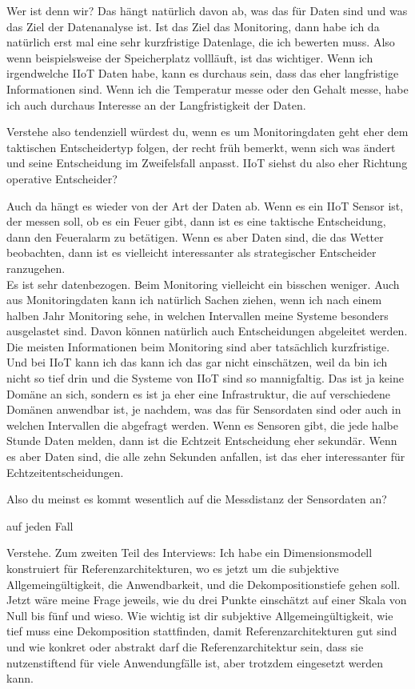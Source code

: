 \PA	 Wer ist denn wir? Das hängt natürlich davon ab, was das für Daten sind und was das Ziel der Datenanalyse ist. Ist das Ziel das Monitoring, dann habe ich da natürlich erst mal eine sehr kurzfristige Datenlage, die ich bewerten muss. Also wenn beispielsweise der Speicherplatz vollläuft, ist das wichtiger. Wenn ich irgendwelche \ac{IIoT} Daten habe, kann es durchaus sein, dass das eher langfristige Informationen sind. Wenn ich die Temperatur messe oder den \coo{} Gehalt messe, habe ich auch durchaus Interesse an der Langfristigkeit der Daten.

\LF	 Verstehe also tendenziell würdest du, wenn es um Monitoringdaten geht eher dem taktischen Entscheidertyp folgen, der recht früh bemerkt, wenn sich was ändert und seine Entscheidung im Zweifelsfall anpasst. \ac{IIoT} siehst du also eher Richtung operative Entscheider?

\PA	Auch da hängt es wieder von der Art der Daten ab. Wenn es ein \ac{IIoT} Sensor ist, der messen soll, ob es ein Feuer gibt, dann ist es eine taktische Entscheidung, dann den Feueralarm zu betätigen. Wenn es aber Daten sind, die das Wetter beobachten, dann ist es vielleicht interessanter als strategischer Entscheider ranzugehen. \\
Es ist sehr datenbezogen. Beim Monitoring vielleicht ein bisschen weniger. Auch aus Monitoringdaten kann ich natürlich Sachen ziehen, wenn ich nach einem halben Jahr Monitoring sehe, in welchen Intervallen meine Systeme besonders ausgelastet sind. Davon können natürlich auch Entscheidungen abgeleitet werden. Die meisten Informationen beim Monitoring sind aber tatsächlich kurzfristige. Und bei \ac{IIoT} kann ich das kann ich das gar nicht einschätzen, weil da bin ich nicht so tief drin und die Systeme von \ac{IIoT} sind so mannigfaltig. Das ist ja keine Domäne an sich, sondern es ist ja eher eine Infrastruktur, die auf verschiedene Domänen anwendbar ist, je nachdem, was das für Sensordaten sind oder auch in welchen Intervallen die abgefragt werden. Wenn es Sensoren gibt, die jede halbe Stunde Daten melden, dann ist die Echtzeit Entscheidung eher sekundär. Wenn es aber Daten sind, die alle zehn Sekunden anfallen, ist das eher interessanter für Echtzeitentscheidungen.

\LF	 Also du meinst es kommt wesentlich auf die Messdistanz der Sensordaten an?

\PA	 auf jeden Fall

\LF	 Verstehe. Zum zweiten Teil des Interviews: Ich habe ein Dimensionsmodell konstruiert für Referenzarchitekturen, wo es jetzt um die subjektive Allgemeingültigkeit, die Anwendbarkeit, und die Dekompositionstiefe gehen soll. Jetzt wäre meine Frage jeweils, wie du drei Punkte einschätzt auf einer Skala von Null bis fünf und wieso. Wie wichtig ist dir subjektive Allgemeingültigkeit, wie tief muss eine Dekomposition stattfinden, damit Referenzarchitekturen gut sind und wie konkret oder abstrakt darf die Referenzarchitektur sein, dass sie nutzenstiftend für viele Anwendungfälle ist, aber trotzdem eingesetzt werden kann.

